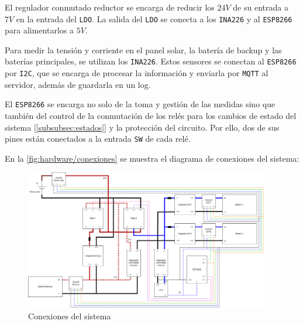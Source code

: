 El regulador conmutado reductor se encarga de reducir los $24 V$ de su entrada a $7 V$ en la entrada del \texttt{LDO}. La salida del \texttt{LDO} se conecta a los \texttt{INA226} y al \texttt{ESP8266} para alimentarlos a $5 V$.

Para medir la tensión y corriente en el panel solar, la batería de backup y las baterías principales, se utilizan los \texttt{INA226}. Estos sensores se conectan al \texttt{ESP8266} por \texttt{I2C}, que se encarga de procesar la información y enviarla por \texttt{MQTT} al servidor, además de guardarla en un log.

El \texttt{ESP8266} se encarga no solo de la toma y gestión de las medidas sino que también del control de la conmutación de los relés para los cambios de estado del sistema [\autoref{subsubsec:estados}] y la protección del circuito. Por ello, dos de sus pines están conectados a la entrada \texttt{SW} de cada relé.

En la \autoref{fig:hardware/conexiones} se muestra el diagrama de conexiones del sistema:

\begin{figure}[H]
    \centering
    \includegraphics[width=0.95\textwidth]{images/2-hardware/Conexiones.png}
    \caption{Conexiones del sistema}
    \label{fig:hardware/conexiones}
\end{figure}
